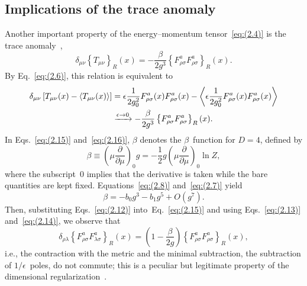 \subsection{Implications of the trace anomaly}
Another important property of the energy--momentum tensor~\eqref{eq:(2.4)} is
the trace anomaly~\cite{Adler:1976zt,Nielsen:1977sy,Collins:1976yq},
\begin{equation}
   \delta_{\mu\nu}\left\{T_{\mu\nu}\right\}_R(x)
   =-\frac{\beta}{2g^3}
   \left\{F_{\rho\sigma}^aF_{\rho\sigma}^a\right\}_R(x).
\label{eq:(2.15)}
\end{equation}
By Eq.~\eqref{eq:(2.6)}, this relation is equivalent to
\begin{align}
   \delta_{\mu\nu}
   \left[T_{\mu\nu}(x)-\left\langle T_{\mu\nu}(x)\right\rangle\right]
   &=\epsilon\frac{1}{2g_0^2}
   F_{\rho\sigma}^a(x)F_{\rho\sigma}^a(x)
   -\left\langle\epsilon\frac{1}{2g_0^2}
   F_{\rho\sigma}^a(x)F_{\rho\sigma}^a(x)\right\rangle
\notag\\
   &\xrightarrow{\epsilon\to0}
   -\frac{\beta}{2g^3}
   \left\{F_{\rho\sigma}^aF_{\rho\sigma}^a\right\}_R(x).
\label{eq:(2.16)}
\end{align}
In Eqs.~\eqref{eq:(2.15)} and~\eqref{eq:(2.16)}, $\beta$ denotes the
$\beta$~function for $D=4$, defined by
\begin{equation}
   \beta\equiv\left(\mu\frac{\partial}{\partial\mu}\right)_0g
   =-\frac{1}{2}g\left(\mu\frac{\partial}{\partial\mu}\right)_0\ln Z,
\label{eq:(2.17)}
\end{equation}
where the subscript~$0$ implies that the derivative is taken while the bare
quantities are kept fixed. Equations~\eqref{eq:(2.8)} and~\eqref{eq:(2.7)}
yield
\begin{equation}
   \beta=-b_0g^3-b_1g^5+O(g^7).
\label{eq:(2.18)}
\end{equation}
Then, substituting Eqs.~\eqref{eq:(2.12)} into~Eq.~\eqref{eq:(2.15)} and using
Eqs.~\eqref{eq:(2.13)} and~\eqref{eq:(2.14)}, we observe that
\begin{equation}
   \delta_{\rho\lambda}
   \left\{F_{\rho\sigma}^aF_{\lambda\sigma}^a\right\}_R(x)
   =\left(1-\frac{\beta}{2g}\right)
   \left\{F_{\rho\sigma}^aF_{\rho\sigma}^a\right\}_R(x),
\label{eq:(2.19)}
\end{equation}
i.e., the contraction with the metric and the minimal subtraction, the
subtraction of $1/\epsilon$~poles, do not commute; this is a peculiar but
legitimate property of the dimensional regularization~\cite{Collins:1984xc}.

